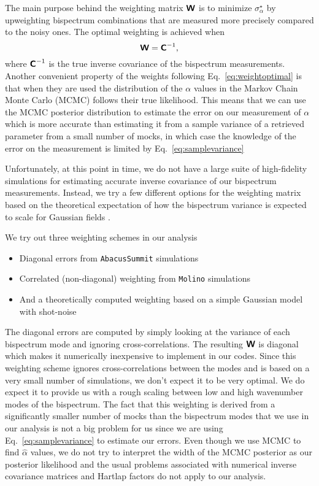 The main purpose behind the weighting matrix $\textbf{\textsf{W}}$ is to minimize $\sigma_\alpha^\star$ by upweighting bispectrum combinations that are measured more precisely compared to the noisy ones. The optimal weighting is achieved when 
\begin{equation}
    \label{eq:weightoptimal}
    \textbf{\textsf{W}} = \textbf{\textsf{C}}^{-1},
\end{equation}
 where $\textbf{\textsf{C}}^{-1}$ is the true inverse covariance of the bispectrum measurements. Another convenient property of the weights following Eq.~\eqref{eq:weightoptimal} is that when they are used the distribution of the $\alpha$ values in the Markov Chain Monte Carlo (MCMC) follows their true likelihood. This means that we can use the MCMC posterior distribution to estimate the error on our measurement of $\alpha$ which is more accurate than estimating it from a sample variance of a retrieved parameter from a small number of mocks, in which case the knowledge of the error on the measurement is limited by Eq.~\eqref{eq:samplevariance} \citep[see, e.g.,][for a comparison of two ways of estimating errors when combining BAO measurements.]{2022JCAP...05..040G}

Unfortunately, at this point in time, we do not have a large suite of high-fidelity simulations for estimating accurate inverse covariance of our bispectrum measurements. Instead, we try a few different options for the weighting matrix based on the theoretical expectation of how the bispectrum variance is expected to scale for Gaussian fields \citep{2017MNRAS.467..928G, 2019MNRAS.490.5931P, 2022PhRvD.106d3515H}. 

We try out three weighting schemes in our analysis
\begin{itemize}
\item Diagonal errors from \texttt{AbacusSummit} simulations
\item Correlated (non-diagonal) weighting from \texttt{Molino} simulations
\item And a theoretically computed weighting based on a simple Gaussian model with shot-noise
\end{itemize}

The diagonal errors are computed by simply looking at the variance of each bispectrum mode and ignoring cross-correlations. The resulting $\textbf{\textsf{W}}$ is diagonal which makes it numerically inexpensive to implement in our codes. Since this weighting scheme ignores cross-correlations between the modes and is based on a very small number of simulations, we don't expect it to be very optimal. We do expect it to provide us with a rough scaling between low and high wavenumber modes of the bispectrum. The fact that this weighting is derived from a significantly smaller number of mocks than the bispectrum modes that we use in our analysis is not a big problem for us since we are using Eq.~\eqref{eq:samplevariance} to estimate our errors. Even though we use MCMC to find $\widehat{\alpha}$ values, we do not try to interpret the width of the MCMC posterior as our posterior likelihood   and the usual problems associated with numerical inverse covariance matrices and Hartlap factors \citep{2007A&A...464..399H, 2013MNRAS.432.1928T, 2013PhRvD..88f3537D, 2014MNRAS.439.2531P} do not apply to our analysis. 

